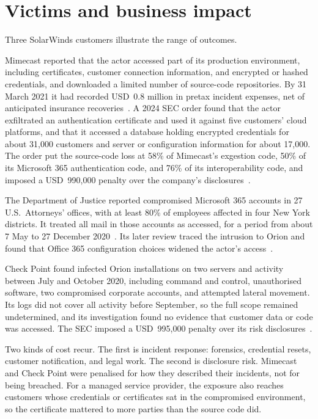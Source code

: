 \section{Victims and business impact}
\label{sec:victims}

Three SolarWinds customers illustrate the range of outcomes.

Mimecast reported that the actor accessed part of its production environment, including certificates, customer connection information, and encrypted or hashed credentials, and downloaded a limited number of source-code repositories. By 31 March 2021 it had recorded USD~0.8 million in pretax incident expenses, net of anticipated insurance recoveries~\cite{mimecast-10k}. A 2024 SEC order found that the actor exfiltrated an authentication certificate and used it against five customers' cloud platforms, and that it accessed a database holding encrypted credentials for about 31,000 customers and server or configuration information for about 17,000. The order put the source-code loss at 58\% of Mimecast's exgestion code, 50\% of its Microsoft 365 authentication code, and 76\% of its interoperability code, and imposed a USD~990,000 penalty over the company's disclosures~\cite{sec-mimecast}.

The Department of Justice reported compromised Microsoft 365 accounts in 27 U.S.\ Attorneys' offices, with at least 80\% of employees affected in four New York districts. It treated all mail in those accounts as accessed, for a period from about 7 May to 27 December 2020~\cite{doj-statement}. Its later review traced the intrusion to Orion and found that Office 365 configuration choices widened the actor's access~\cite{doj-review}.

Check Point found infected Orion installations on two servers and activity between July and October 2020, including command and control, unauthorised software, two compromised corporate accounts, and attempted lateral movement. Its logs did not cover all activity before September, so the full scope remained undetermined, and its investigation found no evidence that customer data or code was accessed. The SEC imposed a USD~995,000 penalty over its risk disclosures~\cite{sec-checkpoint}.

Two kinds of cost recur. The first is incident response: forensics, credential resets, customer notification, and legal work. The second is disclosure risk. Mimecast and Check Point were penalised for how they described their incidents, not for being breached. For a managed service provider, the exposure also reaches customers whose credentials or certificates sat in the compromised environment, so the certificate mattered to more parties than the source code did.

